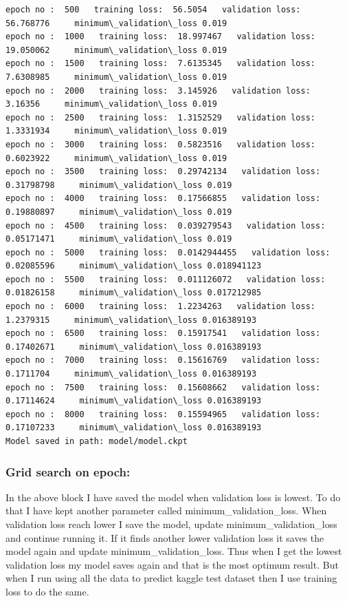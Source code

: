\documentclass[11pt, a4paper , landscape]{article}
\begin{document}
    \begin{Verbatim}[commandchars=\\\{\}]
epoch no :  500   training loss:  56.5054   validation loss:  56.768776     minimum\_validation\_loss 0.019
epoch no :  1000   training loss:  18.997467   validation loss:  19.050062     minimum\_validation\_loss 0.019
epoch no :  1500   training loss:  7.6135345   validation loss:  7.6308985     minimum\_validation\_loss 0.019
epoch no :  2000   training loss:  3.145926   validation loss:  3.16356     minimum\_validation\_loss 0.019
epoch no :  2500   training loss:  1.3152529   validation loss:  1.3331934     minimum\_validation\_loss 0.019
epoch no :  3000   training loss:  0.5823516   validation loss:  0.6023922     minimum\_validation\_loss 0.019
epoch no :  3500   training loss:  0.29742134   validation loss:  0.31798798     minimum\_validation\_loss 0.019
epoch no :  4000   training loss:  0.17566855   validation loss:  0.19880897     minimum\_validation\_loss 0.019
epoch no :  4500   training loss:  0.039279543   validation loss:  0.05171471     minimum\_validation\_loss 0.019
epoch no :  5000   training loss:  0.0142944455   validation loss:  0.02085596     minimum\_validation\_loss 0.018941123
epoch no :  5500   training loss:  0.011126072   validation loss:  0.01826158     minimum\_validation\_loss 0.017212985
epoch no :  6000   training loss:  1.2234263   validation loss:  1.2379315     minimum\_validation\_loss 0.016389193
epoch no :  6500   training loss:  0.15917541   validation loss:  0.17402671     minimum\_validation\_loss 0.016389193
epoch no :  7000   training loss:  0.15616769   validation loss:  0.1711704     minimum\_validation\_loss 0.016389193
epoch no :  7500   training loss:  0.15608662   validation loss:  0.17114624     minimum\_validation\_loss 0.016389193
epoch no :  8000   training loss:  0.15594965   validation loss:  0.17107233     minimum\_validation\_loss 0.016389193
Model saved in path: model/model.ckpt

    \end{Verbatim}

    \subsubsection{Grid search on epoch:}\label{grid-search-on-epoch}

In the above block I have saved the model when validation loss is
lowest. To do that I have kept another parameter called
minimum\_validation\_loss. When validation loss reach lower I save the
model, update minimum\_validation\_loss and continue running it. If it
finds another lower validation loss it saves the model again and update
minimum\_validation\_loss. Thus when I get the lowest validation loss my
model saves again and that is the most optimum result. But when I run
using all the data to predict kaggle test dataset then I use training
loss to do the same.
\end{document}
